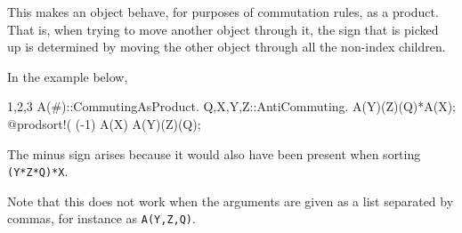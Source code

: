 
This makes an object behave, for purposes of commutation rules, as a
product. That is, when trying to move another object through it, the
sign that is picked up is determined by moving the other object
through all the non-index children. 

In the example below, 
\begin{screen}{1,2,3}
A(#)::CommutingAsProduct.
{Q,X,Y,Z}::AntiCommuting.
A(Y)(Z)(Q)*A(X);
@prodsort!(%
(-1) A(X) A(Y)(Z)(Q);
\end{screen}
The minus sign arises because it would also have been present when
sorting {\tt (Y*Z*Q)*X}. 

Note that this does not work when the arguments are given as a
list separated by commas, for instance as {\tt A(Y,Z,Q)}. 


